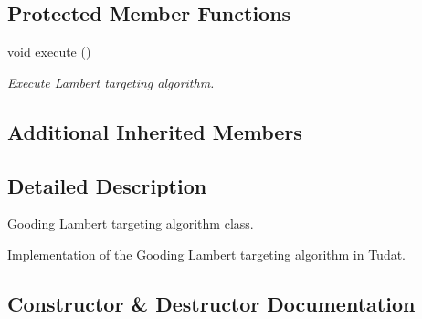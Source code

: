 \subsection*{Protected Member Functions}
\begin{DoxyCompactItemize}
\item 
void \hyperlink{classtudat_1_1mission__segments_1_1LambertTargeterGooding_a6a8d24104f7fd12f753b0df2799b2eff}{execute} ()
\begin{DoxyCompactList}\small\item\em Execute Lambert targeting algorithm. \end{DoxyCompactList}\end{DoxyCompactItemize}
\subsection*{Additional Inherited Members}


\subsection{Detailed Description}
Gooding Lambert targeting algorithm class. 

Implementation of the Gooding Lambert targeting algorithm in Tudat. 

\subsection{Constructor \& Destructor Documentation}
